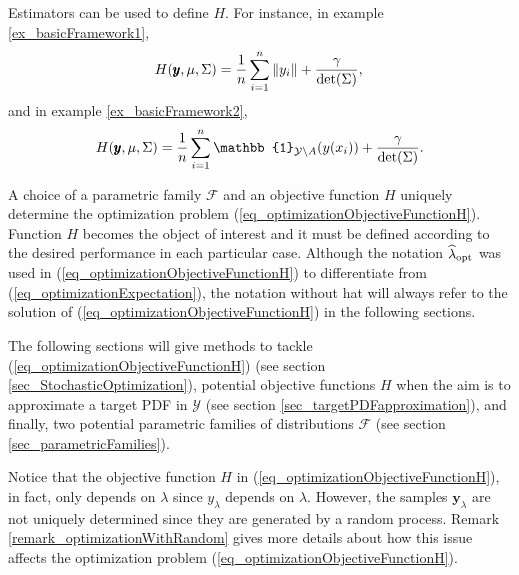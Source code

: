 Estimators can be used to define $H$. For instance, in example \ref{ex_basicFramework1},
\begin{equation} \label{eq_Hexample1}
  H(\pmb{y},\mu,\Sigma) = \frac{1}{n}\sum_{i=1}^n \|y_{i}\| + 
      \frac{\gamma}{\textup{det}(\Sigma)}, \\
\end{equation}
and in example \ref{ex_basicFramework2},
\begin{equation} \label{eq_Hexample2}
  H(\pmb{y},\mu,\Sigma) =  
      \frac{1}{n}\sum_{i=1}^n \mathbb{1}_{\mathcal{Y} \setminus A}(y(x_i)) +
      \frac{\gamma}{\textup{det}(\Sigma)}. \\
\end{equation}

A choice of a parametric family $\mathcal{F}$ and an objective function $H$ uniquely determine the optimization problem (\ref{eq_optimizationObjectiveFunctionH}). 
Function $H$ becomes the object of interest and it must be defined according to the desired performance in each particular case.
Although the notation $\widehat{\lambda}_{\textup{opt}}$ was used in (\ref{eq_optimizationObjectiveFunctionH}) to differentiate from (\ref{eq_optimizationExpectation}), the notation without hat will always refer to the solution of (\ref{eq_optimizationObjectiveFunctionH}) in the following sections.

The following sections will give methods to tackle (\ref{eq_optimizationObjectiveFunctionH}) (see section \ref{sec_StochasticOptimization}), potential objective functions $H$ when the aim is to approximate a target PDF in $\mathcal{Y}$ (see section \ref{sec_targetPDFapproximation}), and finally, two potential parametric families of distributions $\mathcal{F}$ (see section \ref{sec_parametricFamilies}).

\begin{remark} \label{remark_HonlyDependsOnLambda}
Notice that the objective function $H$ in (\ref{eq_optimizationObjectiveFunctionH}), in fact, only depends on $\lambda$ since $y_{\lambda}$ depends on $\lambda$. 
However, the samples $\pmb{y}_{\lambda}$ are not uniquely determined since they are generated by a random process. 
Remark \ref{remark_optimizationWithRandom} gives more details about how this issue affects the optimization problem (\ref{eq_optimizationObjectiveFunctionH}).
\end{remark}

